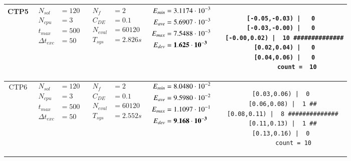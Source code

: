 \begin{table*} [!t]
\begin{tabular}[c]{ccccc}
\hline



CTP5
&
{$\!\begin{aligned}
    N_{sol}        &= 120 \\
	N_{cpu}        &= 3 \\
	t_{max}        &= 500 \\
	\Delta t_{exc} &= 50
\end{aligned}$}
&
{$\!\begin{aligned}
	N_{f}    &= 2 \\
	C_{DE}   &= 0.1 \\
	N_{eval} &= 60120 \\
	T_{sys}  &= 2.826s
\end{aligned}$}
&
{$\!\begin{aligned}
    E_{min} &= 3.1174\cdot 10^{-3} \\
    E_{ave} &= 5.6907\cdot 10^{-3} \\
    E_{max} &= 7.5488\cdot 10^{-3} \\
    E_{dev} &= {\bf 1.625\cdot 10^{-3}}
\end{aligned}$}
&
\begin{minipage}{4.1cm} \fontsize{5pt}{6pt}
\begin{verbatim}
 [-0.05,-0.03) |   0 
 [-0.03,-0.00) |   0 
  [-0.00,0.02) |  10 ##############
   [0.02,0.04) |   0 
   [0.04,0.06) |   0 
         count =  10
 \end{verbatim}
\end{minipage} \\

\hline



CTP6
&
{$\!\begin{aligned}
    N_{sol}        &= 120 \\
	N_{cpu}        &= 3 \\
	t_{max}        &= 500 \\
	\Delta t_{exc} &= 50
\end{aligned}$}
&
{$\!\begin{aligned}
	N_{f}    &= 2 \\
	C_{DE}   &= 0.1 \\
	N_{eval} &= 60120 \\
	T_{sys}  &= 2.552s
\end{aligned}$}
&
{$\!\begin{aligned}
    E_{min} &= 8.0480\cdot 10^{-2} \\
    E_{ave} &= 9.5980\cdot 10^{-2} \\
    E_{max} &= 1.1097\cdot 10^{-1} \\
    E_{dev} &= {\bf 9.168\cdot 10^{-3}}
\end{aligned}$}
&
\begin{minipage}{4.1cm} \fontsize{5pt}{6pt}
\begin{verbatim}
 [0.03,0.06) |  0 
 [0.06,0.08) |  1 ##
 [0.08,0.11) |  8 ##############
 [0.11,0.13) |  1 ##
 [0.13,0.16) |  0 
       count = 10
 \end{verbatim}
\end{minipage} \\


\end{tabular}
\end{table*}
